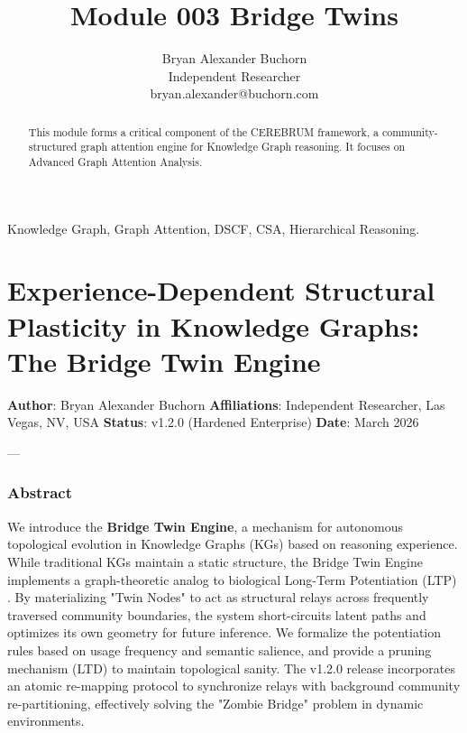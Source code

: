 \documentclass[10pt,journal,compsoc]{IEEEtran}
\begin{document}
\title{Module 003 Bridge Twins}
\author{Bryan Alexander Buchorn \\ Independent Researcher \\ bryan.alexander@buchorn.com}

\maketitle

\begin{abstract}
This module forms a critical component of the CEREBRUM framework, a community-structured graph attention engine for Knowledge Graph reasoning. It focuses on Advanced Graph Attention Analysis.
\end{abstract}

\begin{IEEEkeywords}
Knowledge Graph, Graph Attention, DSCF, CSA, Hierarchical Reasoning.
\end{IEEEkeywords}

\section{Experience-Dependent Structural Plasticity in Knowledge Graphs: The Bridge Twin Engine}

\textbf{Author}: Bryan Alexander Buchorn  
\textbf{Affili\-ations}: Independent Researcher, Las Vegas, NV, USA  
\textbf{Status}: v1.2.0 (Hardened Enterprise)  
\textbf{Date}: March 2026

---

\subsubsection{Abstract}
We introduce the \textbf{Bridge Twin Engine}, a mechanism for autonomous topological evolution in Knowledge Graphs (KGs) based on reasoning experience. While traditional KGs maintain a static structure, the Bridge Twin Engine implements a graph-theoretic analog to biological Long-Term Potent\-iation (LTP) \cite{hebb1949, bipoo1998}. By mater\-ializing "Twin Nodes" to act as structural relays across frequently traversed community boundaries, the system short-circuits latent paths and optimizes its own geometry for future inference. We formalize the poten\-tiation rules based on usage frequency and semantic salience, and provide a pruning mechanism (LTD) to maintain topological sanity. The v1.2.0 release incor\-porates an atomic re-mapping protocol to synchronize relays with background community re-parti\-tioning, effectively solving the "Zombie Bridge" problem in dynamic envir\-onments.
\end{document}
